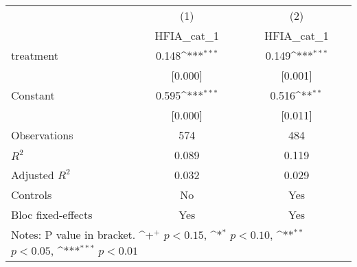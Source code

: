 {
\def\sym#1{\ifmmode^{#1}\else\(^{#1}\)\fi}
\begin{tabular*}{1.2\hsize}{@{\hskip\tabcolsep\extracolsep\fill}l*{2}{c}}
\cline{1-3}\cline{1-3}
     &\multicolumn{1}{c}{(1)}&\multicolumn{1}{c}{(2)}\\
     &\multicolumn{1}{c}{HFIA\_cat\_1}&\multicolumn{1}{c}{HFIA\_cat\_1}\\
\cline{1-3}
treatment&0.148\sym{***}&0.149\sym{***}\\
     &[0.000]         &[0.001]         \\
[1em]
Constant&0.595\sym{***}&0.516\sym{**} \\
     &[0.000]         &[0.011]         \\
\cline{1-3}
Observations&574         &484         \\
\(R^{2}\)&0.089         &0.119         \\
Adjusted \(R^{2}\)&0.032         &0.029         \\
Controls&No         &Yes         \\
Bloc fixed-effects&Yes         &Yes         \\
\cline{1-3}\cline{1-3}
\multicolumn{3}{p{1.0\textwidth}}{\footnotesize Notes: P value in bracket. \sym{+} \(p<0.15\), \sym{*} \(p<0.10\), \sym{**} \(p<0.05\), \sym{***} \(p<0.01\)}\\
\end{tabular*}
}
